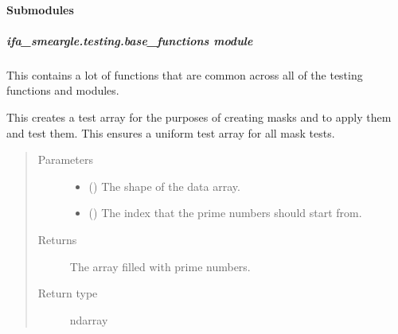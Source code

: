 \documentclass[letterpaper,10pt,english]{sphinxmanual}
\begin{document}
\paragraph{Submodules}
\label{\detokenize{docstrings/ifa_smeargle.testing:submodules}}

\subparagraph{ifa\_smeargle.testing.base\_functions module}
\label{\detokenize{docstrings/ifa_smeargle.testing.base_functions:module-ifa_smeargle.testing.base_functions}}\label{\detokenize{docstrings/ifa_smeargle.testing.base_functions:ifa-smeargle-testing-base-functions-module}}\label{\detokenize{docstrings/ifa_smeargle.testing.base_functions::doc}}
This contains a lot of functions that are common across all of the
testing functions and modules.

\begin{fulllineitems}
\label{\detokenize{docstrings/ifa_smeargle.testing.base_functions:ifa_smeargle.testing.base_functions.create_prime_test_array}}
This creates a test array for the purposes of creating
masks and to apply them and test them. This ensures a
uniform test array for all mask tests.
\begin{quote}\begin{description}
\item[{Parameters}] \leavevmode\begin{itemize}
\item {} 
 () \textendash{} The shape of the data array.

\item {} 
 () \textendash{} The index that the prime numbers should start from.

\end{itemize}

\item[{Returns}] \leavevmode
{} \textendash{} The array filled with prime numbers.

\item[{Return type}] \leavevmode
ndarray

\end{description}\end{quote}

\end{fulllineitems}
\end{document}
